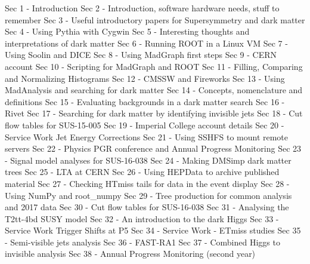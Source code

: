 \documentclass[a4paper,12pt,leqno,openbib,oldfontcommands,oneside]{memoir} %
\begin{document}

\mainmatter


{Sec 1 - Introduction}
{Sec 2 - Introduction, software hardware needs, stuff to remember}
{Sec 3 - Useful introductory papers for Supersymmetry and dark matter}
{Sec 4 - Using Pythia with Cygwin}
{Sec 5 - Interesting thoughts and interpretations of dark matter}
{Sec 6 - Running ROOT in a Linux VM}
{Sec 7 - Using Soolin and DICE}
{Sec 8 - Using MadGraph first steps}
{Sec 9 - CERN account}
{Sec 10 - Scripting for MadGraph and ROOT}
{Sec 11 - Filling, Comparing and Normalizing Histograms}
{Sec 12 - CMSSW and Fireworks}
{Sec 13 - Using MadAnalysis and searching for dark matter}
{Sec 14 - Concepts, nomenclature and definitions}
{Sec 15 - Evaluating backgrounds in a dark matter search}
{Sec 16 - Rivet}
{Sec 17 - Searching for dark matter by identifying invisible jets}
{Sec 18 - Cut flow tables for SUS-15-005}
{Sec 19 - Imperial College account details}
{Sec 20 - Service Work Jet Energy Corrections}
{Sec 21 - Using SSHFS to mount remote servers}
{Sec 22 - Physics PGR conference and Annual Progress Monitoring}
{Sec 23 - Signal model analyses for SUS-16-038}
{Sec 24 - Making DMSimp dark matter trees}
{Sec 25 - LTA at CERN}
{Sec 26 - Using HEPData to archive published material}
{Sec 27 - Checking HTmiss tails for data in the event display}
{Sec 28 - Using NumPy and root_numpy}
{Sec 29 - Tree production for common analysis and 2017 data}
{Sec 30 - Cut flow tables for SUS-16-038}
{Sec 31 - Analysing the T2tt-4bd SUSY model}
{Sec 32 - An introduction to the dark Higgs}
{Sec 33 - Service Work Trigger Shifts at P5}
{Sec 34 - Service Work - ETmiss studies}
{Sec 35 - Semi-visible jets analysis}
{Sec 36 - FAST-RA1}
{Sec 37 - Combined Higgs to invisible analysis}
{Sec 38 - Annual Progress Monitoring (second year)}


\newpage
\backmatter

\printbibliography
{}
\end{document}
